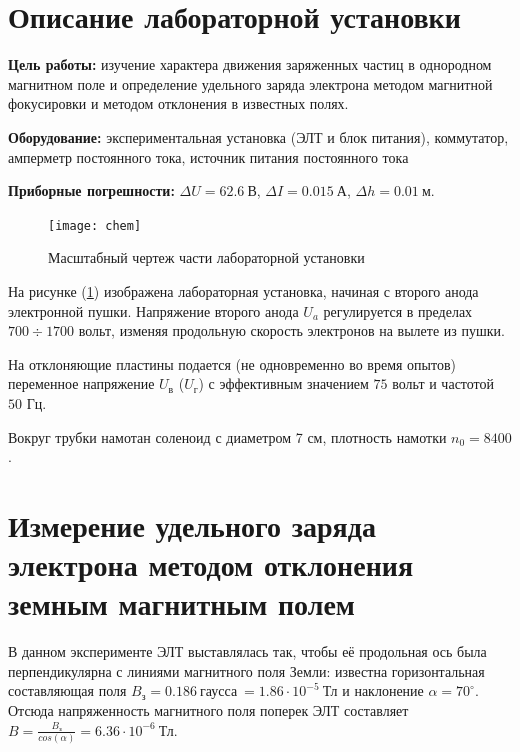 \tableofcontents

% 
\newpage
\section{Описание лабораторной установки}

\textbf{Цель работы:} изучение характера движения заряженных частиц в однородном магнитном поле и определение удельного заряда электрона методом магнитной фокусировки и методом отклонения в известных полях.

\textbf{Оборудование:}
экспериментальная установка (ЭЛТ и блок питания), коммутатор, амперметр постоянного тока, источник питания постоянного тока 

\textbf{Приборные погрешности:} $\Delta{U}=62.6\ \text{В}$, $\Delta{I}=0.015\ \text{А}$, $\Delta{h}=0.01\ \text{м}$. 

\begin{figure}[ht!]
	\centering
	\texttt{[image: chem]}
	\caption{Масштабный чертеж части лабораторной установки}
	\label{fig:cxem}
\end{figure}

На рисунке (\ref{fig:cxem}) изображена лабораторная установка, начиная с второго анода электронной пушки. Напряжение второго анода $U_a$ регулируется в пределах $700\div1700$ вольт, изменяя продольную скорость электронов на вылете из пушки.

На отклоняющие пластины подается (не одновременно во время опытов) переменное напряжение $U_\text{в}$ ($U_\text{г}$) с эффективным значением $75$ вольт и частотой $50$ Гц. 

Вокруг трубки намотан соленоид с диаметром 7 см, плотность намотки $n_0=8400$.


\section{Измерение удельного заряда электрона методом отклонения земным магнитным полем}

В данном эксперименте ЭЛТ выставлялась так, чтобы её продольная ось была перпендикулярна с линиями магнитного поля Земли: известна горизонтальная составляющая поля  $B_\text{з}=0.186\ \text{гаусса}\ =1.86\cdot10^{-5}\ \text{Тл}$ и наклонение $\alpha=70^{\circ}$. Отсюда напряженность магнитного поля поперек ЭЛТ составляет $B=\frac{B_\text{з}}{cos(\alpha)}=6.36\cdot10^{-6}\ \text{Тл}$.

